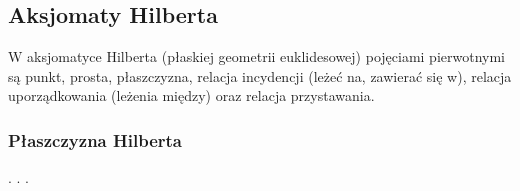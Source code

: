 %

\subsection{Aksjomaty Hilberta}
W aksjomatyce Hilberta (płaskiej geometrii euklidesowej) pojęciami pierwotnymi są punkt, prosta, płaszczyzna, relacja incydencji (leżeć na, zawierać się w), relacja uporządkowania (leżenia między) oraz relacja przystawania.






\subsubsection{Płaszczyzna Hilberta}

. . .

%